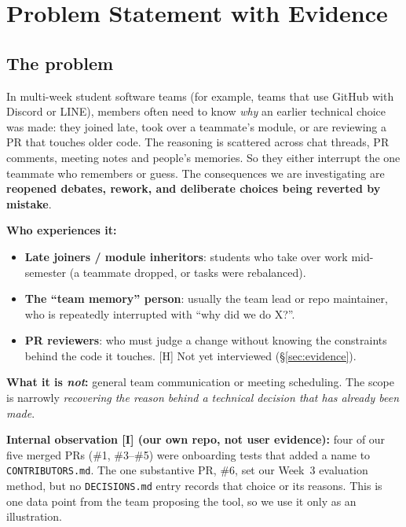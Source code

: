 \documentclass[11pt,a4paper]{article}
\newcommand{\code}[1]{\texttt{#1}}
\begin{document}
\section{Problem Statement with Evidence}\label{sec:problem}

\subsection{The problem}

\begin{keybox}
In multi-week student software teams (for example, teams that use GitHub with Discord or LINE), members often need to know \emph{why} an earlier technical choice was made: they joined late, took over a teammate's module, or are reviewing a PR that touches older code. The reasoning is scattered across chat threads, PR comments, meeting notes and people's memories. So they either interrupt the one teammate who remembers or guess. The consequences we are investigating are \textbf{reopened debates, rework, and deliberate choices being reverted by mistake}.
\end{keybox}

\textbf{Who experiences it:}
\begin{itemize}
  \item \textbf{Late joiners / module inheritors}: students who take over work mid-semester (a teammate dropped, or tasks were rebalanced).
  \item \textbf{The ``team memory'' person}: usually the team lead or repo maintainer, who is repeatedly interrupted with ``why did we do X?''.
  \item \textbf{PR reviewers}: who must judge a change without knowing the constraints behind the code it touches. [H] Not yet interviewed (\S\ref{sec:evidence}).
\end{itemize}

\textbf{What it is \emph{not}:} general team communication or meeting scheduling. The scope is narrowly \emph{recovering the reason behind a technical decision that has already been made}.

\textbf{Internal observation [I] (our own repo, not user evidence):} four of our five merged PRs (\#1, \#3--\#5) were onboarding tests that added a name to \code{CONTRIBUTORS.md}. The one substantive PR, \#6, set our Week~3 evaluation method, but no \code{DECISIONS.md} entry records that choice or its reasons. This is one data point from the team proposing the tool, so we use it only as an illustration.
\end{document}
